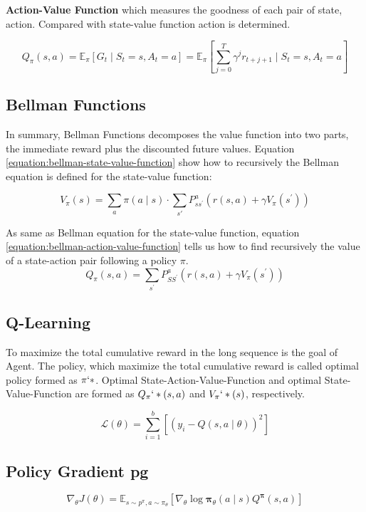 \textbf{Action-Value Function} which measures the goodness of each pair of state, action. Compared with state-value function action is determined.

\begin{equation}
Q_{\pi}(s, a)=\mathbb{E}_{\pi}\left[G_{t} \mid S_{t}=s, A_{t}=a\right]=\mathbb{E}_{\pi}\left[\sum_{j=0}^{T} \gamma^{j} r_{t+j+1} \mid S_{t}=s, A_{t}=a\right]
\end{equation}

\subsection{Bellman Functions}
In summary, Bellman Functions decomposes the value function into two parts, the immediate reward plus the discounted future values. Equation \ref{equation:bellman-state-value-function} show how to recursively the Bellman equation is defined for the state-value function:

\begin{equation} \label{equation:bellman-state-value-function}
V_{\pi}(s)=\sum_{a} \pi(a \mid s) \cdot \sum_{s \prime} P_{s s^{\prime}}^{a}\left(r(s, a)+\gamma V_{\pi}\left(s^{\prime}\right)\right)
\end{equation}

As same as Bellman equation for the state-value function, equation \ref{equation:bellman-action-value-function} tells us how to find recursively the value of a state-action pair following a policy $\pi$.
\begin{equation} \label{equation:bellman-action-value-function}
Q_{\pi}(s, a)=\sum_{s^{\prime}} P_{S S^{\prime}}^{a}\left(r(s, a)+\gamma V_{\pi}\left(s^{\prime}\right)\right)
\end{equation}

\subsection{Q-Learning}
To maximize the total cumulative reward in the long sequence is the goal of Agent. The policy, which maximize the total cumulative reward is called optimal policy formed as $\pi`*$. Optimal State-Action-Value-Function and optimal State-Value-Function are formed as $Q_\pi`*(s, a)$ and $V_\pi`*(s)$, respectively.

\begin{equation}
\mathcal{L}(\theta)=\sum_{i=1}^{b}\left[\left(y_{i}-Q(s, a \mid \theta)\right)^{2}\right]
\end{equation}
\subsection{Policy Gradient \gls{pg}}
\begin{equation}
\nabla_{\theta} J(\theta)=\mathbb{E}_{s \sim p^{\pi}, a \sim \pi_{\theta}}\left[\nabla_{\theta} \log \boldsymbol{\pi}_{\theta}(a \mid s) Q^{\boldsymbol{\pi}}(s, a)\right]
\end{equation}

